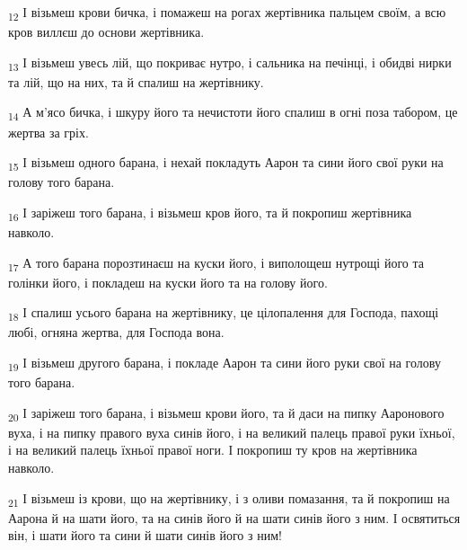 \begin{tcolorbox}
\textsubscript{12} І візьмеш крови бичка, і помажеш на рогах жертівника пальцем своїм, а всю кров виллєш до основи жертівника.
\end{tcolorbox}
\begin{tcolorbox}
\textsubscript{13} І візьмеш увесь лій, що покриває нутро, і сальника на печінці, і обидві нирки та лій, що на них, та й спалиш на жертівнику.
\end{tcolorbox}
\begin{tcolorbox}
\textsubscript{14} А м'ясо бичка, і шкуру його та нечистоти його спалиш в огні поза табором, це жертва за гріх.
\end{tcolorbox}
\begin{tcolorbox}
\textsubscript{15} І візьмеш одного барана, і нехай покладуть Аарон та сини його свої руки на голову того барана.
\end{tcolorbox}
\begin{tcolorbox}
\textsubscript{16} І заріжеш того барана, і візьмеш кров його, та й покропиш жертівника навколо.
\end{tcolorbox}
\begin{tcolorbox}
\textsubscript{17} А того барана порозтинаєш на куски його, і виполощеш нутрощі його та голінки його, і покладеш на куски його та на голову його.
\end{tcolorbox}
\begin{tcolorbox}
\textsubscript{18} І спалиш усього барана на жертівнику, це цілопалення для Господа, пахощі любі, огняна жертва, для Господа вона.
\end{tcolorbox}
\begin{tcolorbox}
\textsubscript{19} І візьмеш другого барана, і покладе Аарон та сини його руки свої на голову того барана.
\end{tcolorbox}
\begin{tcolorbox}
\textsubscript{20} І заріжеш того барана, і візьмеш крови його, та й даси на пипку Ааронового вуха, і на пипку правого вуха синів його, і на великий палець правої руки їхньої, і на великий палець їхньої правої ноги. І покропиш ту кров на жертівника навколо.
\end{tcolorbox}
\begin{tcolorbox}
\textsubscript{21} І візьмеш із крови, що на жертівнику, і з оливи помазання, та й покропиш на Аарона й на шати його, та на синів його й на шати синів його з ним. І освятиться він, і шати його та сини й шати синів його з ним!
\end{tcolorbox}
